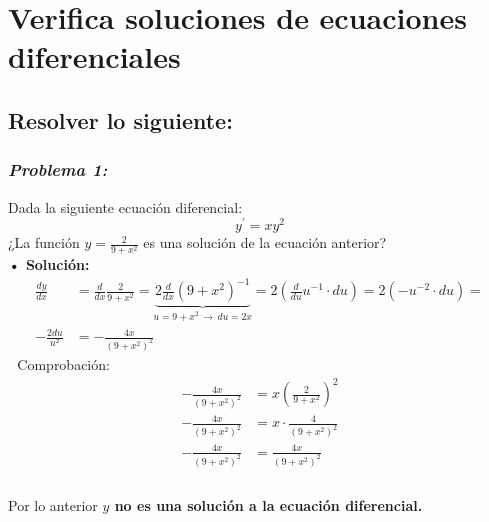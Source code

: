 \documentclass[letterpaper, 12pt]{article}
\begin{document}
\setcounter{page}{1}
\thispagestyle{fancy}
\section*{Verifica soluciones de ecuaciones diferenciales}
\subsection*{Resolver lo siguiente:}
\subsubsection*{\emph{Problema 1:}}
Dada la siguiente ecuación diferencial:
\[y^\prime=xy^2\]
¿La función \(y=\frac{2}{9+x^2}\) es una solución de la ecuación anterior?
\\\newline
\textbf{• Solución:} 
\begin{equation*}
    \begin{aligned}
        \frac{dy}{dx}&=\frac{d}{dx}\frac{2}{9+x^2}=\underbrace{2\frac{d}{dx}(9+x^2)^{-1}}_{u=9+x^2\,\rightarrow\, du=2x}=2\left(\frac{d}{du}u^{-1}\cdot du\right)=2(-u^{-2}\cdot du)=\\
        -\frac{2du}{u^2}&=-\frac{4x}{(9+x^2)^2}
    \end{aligned}
\end{equation*}
\,\, Comprobación:
\begin{equation*}
    \begin{aligned}
        -\frac{4x}{(9+x^2)^2}&=x\left(\frac{2}{9+x^2}\right)^2 \\
        -\frac{4x}{(9+x^2)^2}&=x\cdot\frac{4}{(9+x^2)^2} \\
        -\frac{4x}{(9+x^2)^2}&=\frac{4x}{(9+x^2)^2} \\
    \end{aligned}
\end{equation*}
\\
Por lo anterior \textbf{\(y\) no es una solución a la ecuación diferencial.}
\end{document}
